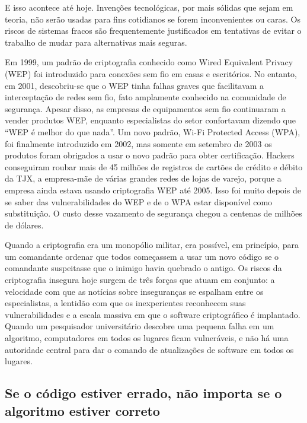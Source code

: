 \documentclass{book}
\begin{document}
E isso acontece até hoje. Invenções tecnológicas, por mais sólidas que sejam em teoria, não serão usadas para fins cotidianos se forem inconvenientes ou caras. Os riscos de sistemas fracos são frequentemente justificados em tentativas de evitar o trabalho de mudar para alternativas mais seguras.

Em 1999, um padrão de criptografia conhecido como Wired Equivalent Privacy (WEP) foi introduzido para conexões sem fio em casas e escritórios. No entanto, em 2001, descobriu-se que o WEP tinha falhas graves que facilitavam a interceptação de redes sem fio, fato amplamente conhecido na comunidade de segurança. Apesar disso, as empresas de equipamentos sem fio continuaram a vender produtos WEP, enquanto especialistas do setor confortavam dizendo que ``WEP é melhor do que nada''. Um novo padrão, Wi-Fi Protected Access (WPA), foi finalmente introduzido em 2002, mas somente em setembro de 2003 os produtos foram obrigados a usar o novo padrão para obter certificação. Hackers conseguiram roubar mais de 45 milhões de registros de cartões de crédito e débito da TJX, a empresa-mãe de várias grandes redes de lojas de varejo, porque a empresa ainda estava usando criptografia WEP até 2005. Isso foi muito depois de se saber das vulnerabilidades do WEP e de o WPA estar disponível como substituição. O custo desse vazamento de segurança chegou a centenas de milhões de dólares.

Quando a criptografia era um monopólio militar, era possível, em princípio, para um comandante ordenar que todos começassem a usar um novo código se o comandante suspeitasse que o inimigo havia quebrado o antigo. Os riscos da criptografia insegura hoje surgem de três forças que atuam em conjunto: a velocidade com que as notícias sobre inseguranças se espalham entre os especialistas, a lentidão com que os inexperientes reconhecem suas vulnerabilidades e a escala massiva em que o software criptográfico é implantado. Quando um pesquisador universitário descobre uma pequena falha em um algoritmo, computadores em todos os lugares ficam vulneráveis, e não há uma autoridade central para dar o comando de atualizações de software em todos os lugares.


\subsection{Se o código estiver errado, não importa se o algoritmo estiver correto}
\label{segredos:errado}
\end{document}

